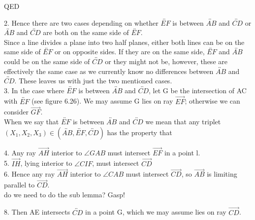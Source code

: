 \documentclass[12pt,letterpaper]{article}
\newcommand{\QED}{\begin{flushright}QED\end{flushright}}
\begin{document}
\QED

\newpage 


2. Hence there are two cases depending on whether $\overleftrightarrow{EF}$ is between $\overleftrightarrow{AB}$ and $\overleftrightarrow{CD}$ or $\overleftrightarrow{AB}$ and $\overleftrightarrow{CD}$ are both on the same side of $\overleftrightarrow{EF}$.\\

Since a line divides a plane into two half planes, either both lines can be on the same side of $\overleftrightarrow{EF}$ or on opposite sides.  If they are on the same side, $\overleftrightarrow{EF}$ and $\overleftrightarrow{AB}$ could be on the same side of $\overleftrightarrow{CD}$ or they might not be, however, these are effectively the same case as we currently know no differences between $\overleftrightarrow{AB}$ and $\overleftrightarrow{CD}$.  These leaves us with just the two mentioned cases.\\



3. In the case where $\overleftrightarrow{EF}$ is between $\overleftrightarrow{AB}$ and $\overleftrightarrow{CD}$, let G be the intersection of AC with $\overleftrightarrow{EF}$ (see figure 6.26).  We may assume G lies on ray $\overrightarrow{EF}$; otherwise we can consider $\overrightarrow{GF}$.\\

When we say that $\overleftrightarrow{EF}$ is between $\overleftrightarrow{AB}$ and $\overleftrightarrow{CD}$ we mean that any triplet $(X_1,X_2,X_3) \in (\overleftrightarrow{AB},\overleftrightarrow{EF},\overleftrightarrow{CD})$ has the property that 




4. Any ray $\overrightarrow{AH}$ interior to $\angle GAB$ must intersect $\overrightarrow{EF}$ in a point l.\\

5. $\overrightarrow{IH}$, lying interior to $\angle CIF$, must intersect $\overrightarrow{CD}$\\

6. Hence any ray $\overrightarrow{AH}$ interior to $\angle CAB$ must intersect $\overrightarrow{CD}$, so $\overrightarrow{AB}$ is limiting parallel to $\overrightarrow{CD}$. \\

do we need to do the sub lemma? Gasp!

8. Then AE intersects $\overleftrightarrow{CD}$ in a point G, which we may assume lies on ray $\overrightarrow{CD}$. \\
\end{document}
